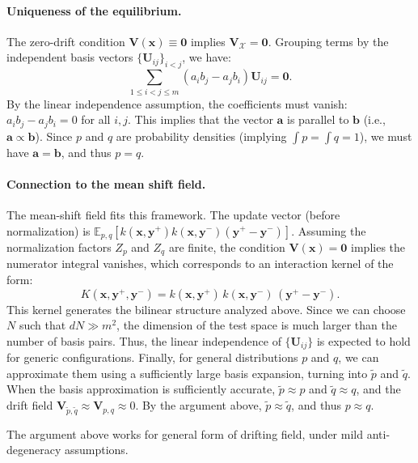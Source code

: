 \paragraph{Uniqueness of the equilibrium.}
The zero-drift condition $\mathbf{V}(\mathbf{x}) \equiv \mathbf{0}$ implies $\mathbf{V}_{\mathcal{X}} = \mathbf{0}$. Grouping terms by the independent basis vectors $\{\mathbf{U}_{ij}\}_{i<j}$, we have:
\begin{equation}
\sum_{1 \le i < j \le m} (a_i b_j - a_j b_i) \mathbf{U}_{ij} = \mathbf{0}.
\end{equation}
By the linear independence assumption, the coefficients must vanish: $a_i b_j - a_j b_i = 0$ for all $i,j$.
This implies that the vector $\mathbf{a}$ is parallel to $\mathbf{b}$ (i.e., $\mathbf{a} \propto \mathbf{b}$).
Since $p$ and $q$ are probability densities (implying $\int p = \int q = 1$), we must have $\mathbf{a} = \mathbf{b}$, and thus $p=q$.

\paragraph{Connection to the mean shift field.}
The mean-shift field fits this framework.
The update vector (before normalization) is
$\mathbb{E}_{p,q}[ k(\mathbf{x},\mathbf{y}^+) k(\mathbf{x},\mathbf{y}^-) (\mathbf{y}^+ - \mathbf{y}^-) ]$.
Assuming the normalization factors $Z_p$ and $Z_q$ are finite, the condition $\mathbf{V}(\mathbf{x}) = \mathbf{0}$ implies the numerator integral vanishes, which corresponds to an interaction kernel of the form:
\begin{equation}
K(\mathbf{x}, \mathbf{y}^+, \mathbf{y}^-) = k(\mathbf{x},\mathbf{y}^+)\, k(\mathbf{x},\mathbf{y}^-)\, (\mathbf{y}^+ - \mathbf{y}^-).
\end{equation}
This kernel generates the bilinear structure analyzed above.
Since we can choose $N$ such that $dN \gg m^2$, the dimension of the test space is much larger than the number of basis pairs. Thus, the linear independence of $\{\mathbf{U}_{ij}\}$ is expected to hold for generic configurations.
Finally, for general distributions $p$ and $q$, we can approximate them using a sufficiently large basis expansion, turning into $\tilde p$ and $\tilde q$. When the basis approximation is sufficiently accurate, $\tilde p \approx p$ and $\tilde q \approx q$, and the drift field $\mathbf{V}_{\tilde p, \tilde q}\approx \mathbf{V}_{p,q}\approx 0$. By the argument above, $\tilde p\approx \tilde q$, and thus $p\approx q$.


The argument above works for general form of drifting field, under mild anti-degeneracy assumptions.


